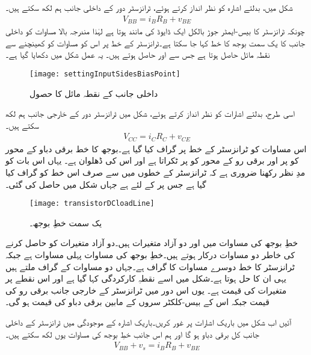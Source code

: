 شکل   میں، بدلتے اشارہ   کو نظر انداز کرتے ہوئے، ٹرانزسٹر دور کے داخلی جانب ہم لکھ سکتے ہیں۔
\begin{align}
V_{BB}=i_B R_B + v_{BE}
\end{align}
چونکہ ٹرانزسٹر کا بیس-ایمٹر  جوڑ بالکل ایک ڈایوڈ کی مانند ہوتا ہے لہٰذا مندرجہ بالا مساوات کو داخلی جانب کا یک سمت بوجھ کا خط  کہا جا سکتا ہے۔ٹرانزسٹر کے  خط پر اس کو مساوات کو کھینچنے سے نقطہ مائل حاصل ہوتا ہے جس سے  اور  حاصل ہوتے ہیں۔ یہ عمل شکل   میں دکھایا گیا ہے۔
\begin{figure}
\centering
\texttt{[image: settingInputSidesBiasPoint]}
\caption{داخلی جانب کے نقطہ مائل کا حصول}
\label{شکل_داخلی_جانب_نکتہ_مائل_کا_حصول}
\end{figure}
اسی طرح، بدلتے اشارات کو نظر انداز کرتے ہوئے، شکل   میں ٹرانزسٹر دور کے خارجی جانب ہم لکھ سکتے ہیں۔
\begin{align} \label{مساوات_ٹرانزسٹر_بار}
V_{CC}=i_C R_C + v_{CE}
\end{align}
اس مساوات کو ٹرانزسٹر کے   خط پر گراف کیا گیا ہے۔بوجھ کا خط برقی دباو کے محور کو  پر اور برقی رو کے محور کو
پر ٹکراتا ہے اور اس کی ڈھلوان  ہے۔ یہاں اس بات کو مدِ نظر رکھنا ضروری ہے کہ ٹرانزسٹر کے   خطوں میں سے صرف اس خط کو گراف کیا گیا ہے جس پر  کے لئے ہے جہاں  شکل   میں حاصل کی گئی۔
\begin{figure}
\centering
\texttt{[image: transistorDCloadLine]}
\caption{یک سمت خطِ بوجھ۔}
\label{شکل_ٹرانزسٹر_کے_یک_سمتی_بار_کا_خط}
\end{figure}
خطِ بوجھ  کی مساوات میں  اور  دو آزاد متغیرات ہیں۔دو آزاد متغیرات کو حاصل کرنے کی خاطر دو مساوات درکار ہوتے ہیں۔خطِ بوجھ کی مساوات پہلی مساوات ہے جبکہ ٹرانزسٹر کا  خط دوسرے مساوات کا گراف ہے۔جہاں دو مساوات کے گراف ملتے ہیں یہی ان کا حل ہوتا ہے۔شکل  میں اسے نقطہِ کارکردگی    کہا گیا ہے اور اس نقطے پر متغیرات کی قیمت    ہے۔ یوں اس دور میں ٹرانزسٹر کے خارجی جانب برقی رو کی قیمت جبکہ اس کے بیس-کلکٹر سروں کے مابین برقی دباو کی قیمت ہو گی۔


آئیں اب شکل   میں باریک اشارات پر غور کریں۔باریک اشارہ  کے موجودگی میں ٹرانزسٹر کے داخلی جانب کل برقی دباو  ہو گا اور ہم اس جانب خطِ بوجھ کی مساوات یوں لکھ سکتے ہیں۔
\begin{align}
V_{BB}+v_s = i_B R_B +v_{BE}
\end{align}

